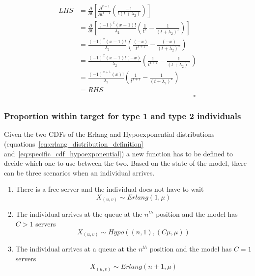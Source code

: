 \begin{itemize}
\begin{enumerate}
        \begin{equation*}
            \begin{split}
                LHS &= \frac{\partial}{\partial t}
                \left[ \frac{\partial^{x-1}}{\partial t ^ {x-1}}
                \left( \frac{-1}{t (t + \lambda_2)} \right) \right] \\
                &= \frac{\partial}{\partial t} \left[
                    \frac{(-1)^x (x-1)!}{\lambda_2} \left(
                        \frac{1}{t^x} - \frac{1}{(t + \lambda_2)^x}
                    \right)
                \right] \\
                &= \frac{(-1)^x (x-1)!}{\lambda_2} \left(
                    \frac{(-x)}{t^{x+1}} - \frac{(-x)}{(t + \lambda_2)^x}
                \right) \\
                &= \frac{(-1)^x (x-1)! (-x)}{\lambda_2} \left(
                    \frac{1}{t^{x+1}} - \frac{1}{(t + \lambda_2)^x}
                \right) \\
                &= \frac{(-1)^{x+1} (x)!}{\lambda_2} \left(
                    \frac{1}{t^{x+1}} - \frac{1}{(t + \lambda_2)^x}
                \right) \\
                & = RHS \\
                & \hspace{7cm} \square
            \end{split}
        \end{equation*}
    \end{enumerate}
\end{itemize}

\subsubsection{Proportion within target for type 1 and type 2 individuals}

Given the two CDFs of the Erlang and Hypoexponential distributions
(equations~\eqref{eq:erlang_distribution_definition}
and~\eqref{eq:specific_cdf_hypoexponential}) a new function has to be defined to
decide which one to use between the two.
Based on the state of the model, there can be three scenarios when an individual
arrives.
\begin{enumerate}
    \item There is a free server and the individual does not have to wait
    \begin{equation*}
        X_{(u,v)} \sim Erlang(1, \mu)
    \end{equation*}
    \item The individual arrives at the queue at the \(n^{th}\) position and the
    model has \(C > 1\) servers
    \begin{equation*}
        X_{(u,v)} \sim Hypo((n, 1), (C \mu, \mu))
    \end{equation*}
    \item The individual arrives at a queue at the \(n^{th}\) position and the
    model has \(C = 1\) servers
    \begin{equation*}
        X_{(u,v)} \sim Erlang(n + 1, \mu)
    \end{equation*}
\end{enumerate}

